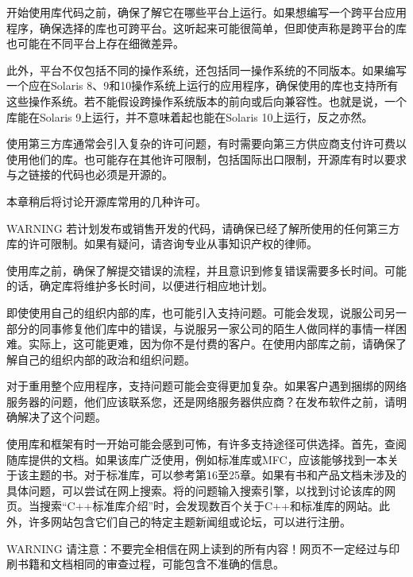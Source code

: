 
开始使用库代码之前，确保了解它在哪些平台上运行。如果想编写一个跨平台应用程序，确保选择的库也可跨平台。这听起来可能很简单，但即使声称是跨平台的库也可能在不同平台上存在细微差异。

此外，平台不仅包括不同的操作系统，还包括同一操作系统的不同版本。如果编写一个应在Solaris 8、9和10操作系统上运行的应用程序，确保使用的库也支持所有这些操作系统。若不能假设跨操作系统版本的前向或后向兼容性。也就是说，一个库能在Solaris 9上运行，并不意味着起也能在Solaris 10上运行，反之亦然。


使用第三方库通常会引入复杂的许可问题，有时需要向第三方供应商支付许可费以使用他们的库。也可能存在其他许可限制，包括国际出口限制，开源库有时以要求与之链接的代码也必须是开源的。

本章稍后将讨论开源库常用的几种许可。

\begin{myWarning}{WARNING}
若计划发布或销售开发的代码，请确保已经了解所使用的任何第三方库的许可限制。如果有疑问，请咨询专业从事知识产权的律师。
\end{myWarning}


使用库之前，确保了解提交错误的流程，并且意识到修复错误需要多长时间。可能的话，确定库将维护多长时间，以便进行相应地计划。

即使使用自己的组织内部的库，也可能引入支持问题。可能会发现，说服公司另一部分的同事修复他们库中的错误，与说服另一家公司的陌生人做同样的事情一样困难。实际上，这可能更难，因为你不是付费的客户。在使用内部库之前，请确保了解自己的组织内部的政治和组织问题。

对于重用整个应用程序，支持问题可能会变得更加复杂。如果客户遇到捆绑的网络服务器的问题，他们应该联系您，还是网络服务器供应商？在发布软件之前，请明确解决了这个问题。

使用库和框架有时一开始可能会感到可怖，有许多支持途径可供选择。首先，查阅随库提供的文档。如果该库广泛使用，例如标准库或MFC，应该能够找到一本关于该主题的书。对于标准库，可以参考第16至25章。如果有书和产品文档未涉及的具体问题，可以尝试在网上搜索。将的问题输入搜索引擎，以找到讨论该库的网页。当搜索“C++标准库介绍”时，会发现数百个关于C++和标准库的网站。此外，许多网站包含它们自己的特定主题新闻组或论坛，可以进行注册。

\begin{myWarning}{WARNING}
请注意：不要完全相信在网上读到的所有内容！网页不一定经过与印刷书籍和文档相同的审查过程，可能包含不准确的信息。
\end{myWarning}

